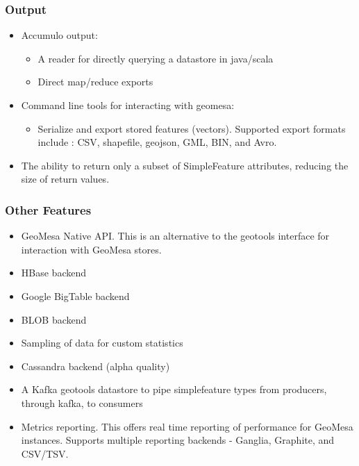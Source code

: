 \subsubsection*{Output}

\begin{itemize}
\item{
  Accumulo output:
  \begin{itemize}
  \item A reader for directly querying a datastore in java/scala
  \item Direct map/reduce exports
  \end{itemize}
}
\item{
  Command line tools for interacting with geomesa:
  \begin{itemize}
  \item Serialize and export stored features (vectors).  Supported export formats include : CSV, shapefile, geojson, GML, BIN, and Avro.
  \end{itemize}
}
\item The ability to return only a subset of SimpleFeature attributes, reducing the size of return values.
\end{itemize}


\subsubsection*{Other Features}

\begin{itemize}
\item{
  GeoMesa Native API.
  This is an alternative to the geotools interface for interaction with GeoMesa stores.
}
\item HBase backend
\item Google BigTable backend
\item BLOB backend
\item Sampling of data for custom statistics
\item Cassandra backend (alpha quality)
\item A Kafka geotools datastore to pipe simplefeature types from producers, through kafka, to consumers
\item{
  Metrics reporting.
  This offers real time reporting of performance for GeoMesa instances.
  Supports multiple reporting backends - Ganglia, Graphite, and CSV/TSV.
}
\end{itemize}
